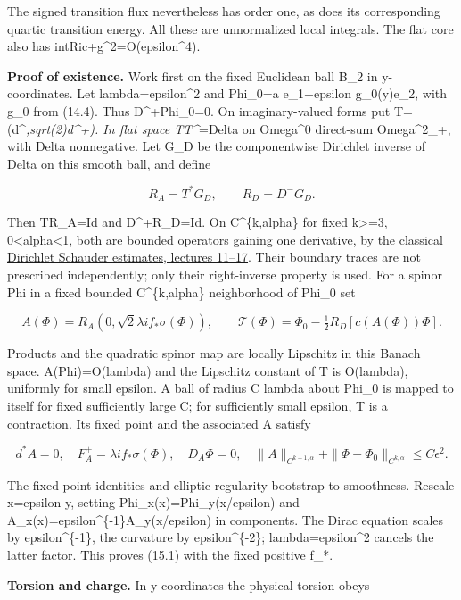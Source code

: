\documentclass[
  10pt,
]{article}
\begin{document}
The signed transition flux nevertheless has order one, as does its
corresponding quartic transition energy. All these are unnormalized
local integrals. The flat core also has
int\textbar Ric+g\textbar\^{}2=O(epsilon\^{}4).

\textbf{Proof of existence.} Work first on the fixed Euclidean ball B\_2
in y-coordinates. Let lambda=epsilon\^{}2 and Phi\_0=a e\_1+epsilon
g\_0(y)e\_2, with g\_0 from (14.4). Thus D\^{}+Phi\_0=0. On
imaginary-valued forms put T=(d\^{}\emph{,sqrt(2)d\^{}+). In flat space
TT\^{}}=Delta on Omega\^{}0 direct-sum Omega\^{}2\_+, with Delta
nonnegative. Let G\_D be the componentwise Dirichlet inverse of Delta on
this smooth ball, and define

\[
 R_A=T^*G_D,\qquad R_D=D^-G_D.
\]

Then TR\_A=Id and D\^{}+R\_D=Id. On C\^{}\{k,alpha\} for fixed
k\textgreater=3, 0\textless alpha\textless1, both are bounded operators
gaining one derivative, by the classical
\href{https://ocw.mit.edu/courses/18-156-differential-analysis-spring-2004/pages/lecture-notes/}{Dirichlet
Schauder estimates, lectures 11--17}. Their boundary traces are not
prescribed independently; only their right-inverse property is used. For
a spinor Phi in a fixed bounded C\^{}\{k,alpha\} neighborhood of Phi\_0
set

\[
 A(\Phi)=R_A(0,\sqrt2\lambda i f_*\sigma(\Phi)),\qquad
 \mathcal T(\Phi)=\Phi_0-\tfrac12R_D[c(A(\Phi))\Phi]. \tag{15.4}
\]

Products and the quadratic spinor map are locally Lipschitz in this
Banach space. A(Phi)=O(lambda) and the Lipschitz constant of T is
O(lambda), uniformly for small epsilon. A ball of radius C lambda about
Phi\_0 is mapped to itself for fixed sufficiently large C; for
sufficiently small epsilon, T is a contraction. Its fixed point and the
associated A satisfy

\[
 d^*A=0,\quad F_A^+=\lambda i f_*\sigma(\Phi),\quad D_A\Phi=0,
 \quad \|A\|_{C^{k+1,\alpha}}+
        \|\Phi-\Phi_0\|_{C^{k,\alpha}}\le C\epsilon^2.
\]

The fixed-point identities and elliptic regularity bootstrap to
smoothness. Rescale x=epsilon y, setting Phi\_x(x)=Phi\_y(x/epsilon) and
A\_x(x)=epsilon\^{}\{-1\}A\_y(x/epsilon) in components. The Dirac
equation scales by epsilon\^{}\{-1\}, the curvature by
epsilon\^{}\{-2\}; lambda=epsilon\^{}2 cancels the latter factor. This
proves (15.1) with the fixed positive f\_*.

\textbf{Torsion and charge.} In y-coordinates the physical torsion obeys
\end{document}

